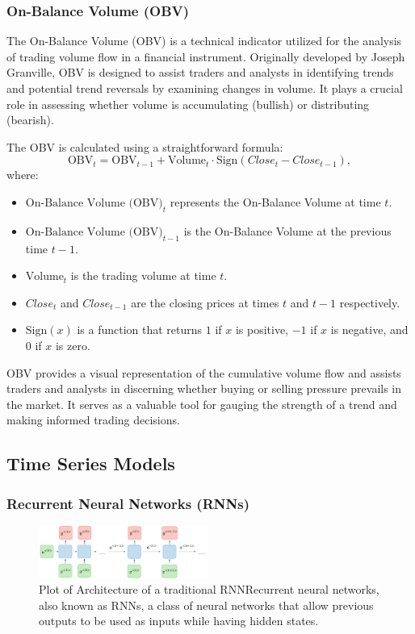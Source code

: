\documentclass[10pt,twocolumn,letterpaper]{article}
\begin{document}
\subsubsection{On-Balance Volume (OBV)}

The On-Balance Volume (OBV) is a technical indicator utilized for the analysis of trading volume flow in a financial instrument. Originally developed by Joseph Granville, OBV is designed to assist traders and analysts in identifying trends and potential trend reversals by examining changes in volume. It plays a crucial role in assessing whether volume is accumulating (bullish) or distributing (bearish).

The OBV is calculated using a straightforward formula:
\[
   \text{OBV}_{t} = \text{OBV}_{t-1} + \text{Volume}_{t} \cdot \text{Sign}(Close_{t} - Close_{t-1}),
\]
where:
\begin{itemize}
   \item \(\text{On-Balance Volume (OBV)}_{t}\) represents the On-Balance Volume at time \(t\).
   \item \(\text{On-Balance Volume (OBV)}_{t-1}\) is the On-Balance Volume at the previous time \(t-1\).
   \item \(\text{Volume}_{t}\) is the trading volume at time \(t\).
   \item \(Close_{t}\) and \(Close_{t-1}\) are the closing prices at times \(t\) and \(t-1\) respectively.
   \item \(\text{Sign}(x)\) is a function that returns \(1\) if \(x\) is positive, \(-1\) if \(x\) is negative, and \(0\) if \(x\) is zero.
\end{itemize}

OBV provides a visual representation of the cumulative volume flow and assists traders and analysts in discerning whether buying or selling pressure prevails in the market. It serves as a valuable tool for gauging the strength of a trend and making informed trading decisions.

\subsection{Time Series Models}

\subsubsection{Recurrent Neural Networks (RNNs)}

\begin{figure}[htbp]
   \centering
   \includegraphics[width=0.49\textwidth]{Fig/1.png}
   \caption{Plot of Architecture of a traditional RNNRecurrent neural networks, also known as RNNs, a class of neural networks that allow previous outputs to be used as inputs while having hidden states.} \label{fig1}
\end{figure}
\end{document}
